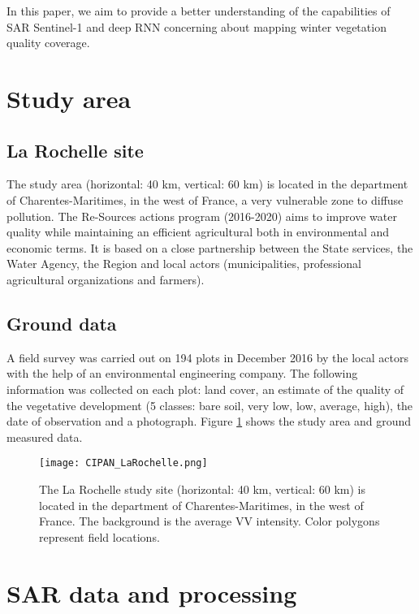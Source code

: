 \documentclass[journal, onecolumn]{IEEEtran}
\begin{document}
In this paper, we aim to provide a better understanding of the capabilities of SAR Sentinel-1 and deep RNN concerning about  mapping winter vegetation quality coverage. 


\section{Study area \label{sec:area}}

\subsection{La Rochelle site\label{sec:IRF-1} }

The study area (horizontal: 40 km, vertical: 60 km) is located in the department of Charentes-Maritimes, in the west of France, a very vulnerable zone to diffuse pollution. The Re-Sources actions program (2016-2020) aims to improve water quality while maintaining an efficient agricultural both in environmental and economic terms. It is based on a close partnership between the State services, the Water Agency, the Region and local actors (municipalities, professional agricultural organizations and farmers). 

\subsection{Ground data\label{sec:IRF-2} }
A field survey was carried out on 194 plots in December 2016 by the local actors with the help of an environmental engineering company. The following information was collected on each plot: land cover, an estimate of the quality of the vegetative development (5 classes: bare soil, very low, low, average, high), the date of observation and a photograph. Figure \ref{fig:StudyArea} shows the study area and ground  measured data.


\begin{figure}[ht!]
\centering
\texttt{[image: CIPAN\_LaRochelle.png]}
\caption{The La Rochelle study site  (horizontal: 40 km, vertical: 60 km) is located in the department of Charentes-Maritimes, in the west of France. The background is the average VV intensity. Color polygons represent field locations. \label{fig:StudyArea}}
\end{figure}


\section{SAR data and processing \label{sec:SAR-data}}
\end{document}
